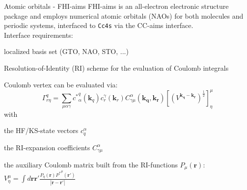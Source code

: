 \begin{block}{\large Atomic orbitals - FHI-aims}
  FHI-aims is an all-electron electronic structure
  package and employs numerical atomic orbitals (NAOs) for both
  molecules and periodic systems,
  interfaced to \texttt{Cc4s} via the CC-aims
  interface\cite{moerman2022interface}. \\

  Interface requirements:
  \begin{compactitem}
  \item localized basis set (GTO, NAO, STO, ...)
  \item Resolution-of-Identity (RI) scheme for the
    evaluation of Coulomb integrals
  \end{compactitem}
  \smallskip

  Coulomb vertex can be evaluated via:
  \begin{equation*}\label{local-vertex}
    \Gamma_{r\eta}^{q}
    =\sum_{\mu\alpha\gamma}
    {c^*}_\alpha^q (\bm{k}_q)c_r^\gamma(\bm{k}_r)
    C_{\gamma\mu}^{\alpha}(\bm{k_q},\bm{k_r})
    \left[\left(V^{\bm{k_q}-\bm{k_r}}\right)^\frac12\right]_\eta^\mu
  \end{equation*}
  with
  \begin{compactitem}
  \item the HF/KS-state vectors $c_{q}^{\alpha}$
  \item the RI-expansion coefficients $C_{\gamma\mu}^{\alpha}$
  \item the auxiliary Coulomb matrix built from the RI-functions
    $P_{\mu}(\bm{r})$:
    $V^{\mu}_{\eta} = \int d\bm{r}\bm{r'} \frac{P_{\eta}(\bm{r}){P^*}^{\mu}(\bm{r'})}{|\bm{r}-\bm{r'}|}$
  \end{compactitem}
\end{block}
